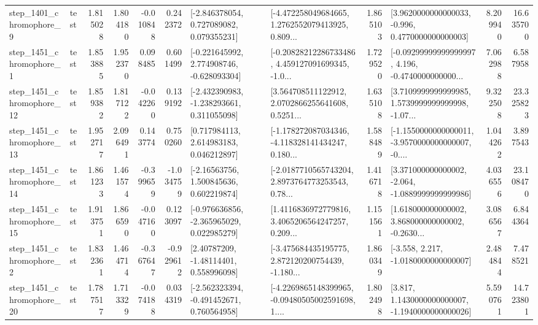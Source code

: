 \begin{tabular}{llrrrrllrlrr}
  step\_1401\_chromophore\_9 &      test &      1.815028 &    1.804180 &     -0.010848 &  0.242372 &    [-2.846378054, 0.727089082, 0.079355231] &  [-4.472258049684665, 1.2762552079413925, 0.809... &       1.865103 &   [3.9620000000000033, -0.996, 0.4770000000000003] &            8.209940 &         16.635700 \\
  step\_1451\_chromophore\_1 &      test &      1.853885 &    1.952370 &      0.098485 &  0.601499 &   [-0.221645992, 2.774908746, -0.628093304] &  [-0.20828212286733486, 4.459127091699345, -1.0... &       1.729520 &  [-0.09299999999999997, 4.196, -0.4740000000000... &            7.062988 &          6.587958 \\
 step\_1451\_chromophore\_12 &      test &      1.859382 &    1.817122 &     -0.042260 &  0.139192 &   [-2.432390983, -1.238293661, 0.311055098] &  [3.564708511122912, 2.0702866255641608, 0.5251... &       1.635108 &  [3.7109999999999985, 1.5739999999999998, -1.07... &            9.322508 &         23.325823 \\
 step\_1451\_chromophore\_13 &      test &      1.952717 &    2.096491 &      0.143774 &  0.750260 &     [0.717984113, 2.614983183, 0.046212897] &  [-1.178272087034346, -4.118328141434247, 0.180... &       1.588489 &  [-1.1550000000000011, -3.9570000000000007, -0.... &            1.044262 &          3.897543 \\
 step\_1451\_chromophore\_14 &      test &      1.861233 &    1.461574 &     -0.399659 & -1.034759 &     [-2.16563756, 1.500845636, 0.602219874] &  [-2.0187710565743204, 2.8973764773253543, 0.78... &       1.416718 &   [3.371000000000002, -2.064, -1.0889999999999986] &            4.036556 &         23.108470 \\
 step\_1451\_chromophore\_15 &      test &      1.913751 &    1.866590 &     -0.047160 &  0.123097 &   [-0.976636856, -2.365965029, 0.022985279] &  [1.4116836972779816, 3.4065206564247257, 0.209... &       1.151561 &  [1.618000000000002, 3.868000000000002, -0.2630... &            3.086567 &          6.844364 \\
  step\_1451\_chromophore\_2 &      test &      1.832361 &    1.464714 &     -0.367647 & -0.929612 &      [2.40787209, -1.48114401, 0.558996098] &  [-3.475684435195775, 2.872120200754439, -1.180... &       1.860349 &               [-3.558, 2.217, -1.0180000000000007] &            2.484844 &          7.478521 \\
 step\_1451\_chromophore\_20 &      test &      1.787517 &    1.713329 &     -0.074188 &  0.034319 &   [-2.562323394, -0.491452671, 0.760564958] &  [-4.2269865148399965, -0.09480505002591698, 1.... &       1.802498 &   [3.817, 1.1430000000000007, -1.1940000000000026] &            5.590761 &         14.723801 \\

\end{tabular}
